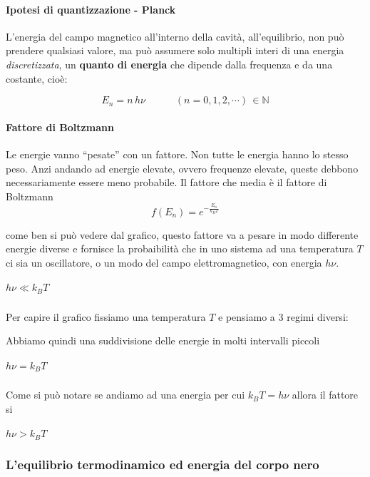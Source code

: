 \documentclass[11pt]{article}
\def\gt{>}
\begin{document}
\hypertarget{ipotesi-di-quantizzazione---planck}{%
\paragraph{Ipotesi di quantizzazione -
Planck}\label{ipotesi-di-quantizzazione---planck}}

L'energia del campo magnetico all'interno della cavità, all'equilibrio,
non può prendere qualsiasi valore, ma può assumere solo multipli interi
di una energia \emph{discretizzata}, un \textbf{quanto di energia} che
dipende dalla frequenza e da una costante, cioè:

\[
\label{eq:planck}
E_n=n\,h\nu \quad\qquad (n=0,1,2,\cdots)\,\in \mathbb{N}
\]

    \hypertarget{fattore-di-boltzmann}{%
\paragraph{Fattore di Boltzmann}\label{fattore-di-boltzmann}}

Le energie vanno ``pesate'' con un fattore. Non tutte le energia hanno
lo stesso peso. Anzi andando ad energie elevate, ovvero frequenze
elevate, queste debbono necessariamente essere meno probabile. Il
fattore che media è il fattore di Boltzmann \[
f(E_n)=e^{-\frac{E_n}{k_BT}}
\]

come ben si può vedere dal grafico, questo fattore va a pesare in modo
differente energie diverse e fornisce la probaibilità che in uno sistema
ad una temperatura \(T\) ci sia un oscillatore, o un modo del campo
elettromagnetico, con energia \(h\nu\).

    \hypertarget{hnu-ll-k_bt}{%
\subparagraph{\texorpdfstring{\(h\nu \ll k_BT\)}{h\textbackslash{}nu \textbackslash{}ll k\_BT}}\label{hnu-ll-k_bt}}

Per capire il grafico fissiamo una temperatura \(T\) e pensiamo a 3
regimi diversi:

Abbiamo quindi una suddivisione delle energie in molti intervalli
piccoli

    \hypertarget{hnuk_bt}{%
\subparagraph{\texorpdfstring{\(h\nu=k_BT\)}{h\textbackslash{}nu=k\_BT}}\label{hnuk_bt}}

Come si può notare se andiamo ad una energia per cui \(k_BT=h\nu\)
allora il fattore si

    \hypertarget{hnu-gt-k_bt}{%
\subparagraph{\texorpdfstring{\(h\nu \gt k_BT\)}{h\textbackslash{}nu \textbackslash{}gt k\_BT}}\label{hnu-gt-k_bt}}

    \hypertarget{lequilibrio-termodinamico-ed-energia-del-corpo-nero}{%
\subsubsection{L'equilibrio termodinamico ed energia del corpo
nero}\label{lequilibrio-termodinamico-ed-energia-del-corpo-nero}}
\end{document}
